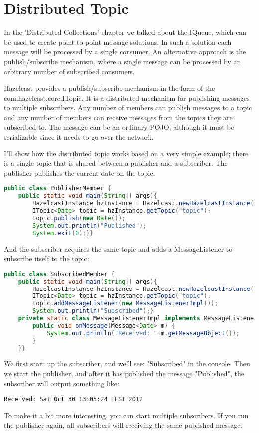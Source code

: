 \chapter{Distributed Topic}
In the 'Distributed Collections' chapter we talked about the IQueue, which can be used to create point to point message solutions. In such a solution each message will be processed by a single consumer. An alternative approach is the publish/subscribe mechanism, where a single message can be processed by an arbitrary number of subscribed consumers.

Hazelcast provides a publish/subscribe mechanism in the form of the com.hazelcast.core.ITopic. It is a distributed mechanism for publishing messages to multiple subscribers. Any number of members can publish messages to a topic and any number of members can receive messages from the topics they are subscribed to. The message can be an ordinary POJO, although it must be serializable since it needs to go over the network.

I'll show how the distributed topic works based on a very simple example; there is a single topic that is shared between a publisher and a subscriber. The publisher publishes the current date on the topic:
\begin{lstlisting}[language=java]
public class PublisherMember {
    public static void main(String[] args){
        HazelcastInstance hzInstance = Hazelcast.newHazelcastInstance();
        ITopic<Date> topic = hzInstance.getTopic("topic");
        topic.publish(new Date());
        System.out.println("Published");
        System.exit(0);}}
\end{lstlisting}
And the subscriber acquires the same topic and adds a MessageListener to subscribe itself to the topic:
\begin{lstlisting}[language=java]
public class SubscribedMember {
    public static void main(String[] args){
        HazelcastInstance hzInstance = Hazelcast.newHazelcastInstance();
        ITopic<Date> topic = hzInstance.getTopic("topic");
        topic.addMessageListener(new MessageListenerImpl());
        System.out.println("Subscribed");}
    private static class MessageListenerImpl implements MessageListener<Date> {
        public void onMessage(Message<Date> m) {
            System.out.println("Received: "+m.getMessageObject());
        }
    }}
\end{lstlisting}
We first start up the subscriber, and we'll see: "Subscribed" in the console. Then we start the publisher, and after it has published the message "Published", the subscriber will output something like:
\begin{lstlisting}
Received: Sat Oct 30 13:05:24 EEST 2012
\end{lstlisting}
To make it a bit more interesting, you can start multiple subscribers. If you run the publisher again, all subscribers will receiving the same published message.

